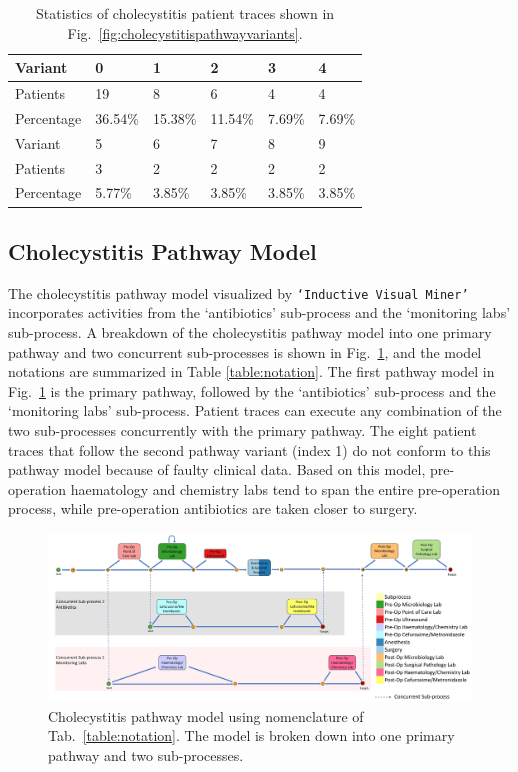 \documentclass{article}
\begin{document}
\begin{table}[t]
\centering
\caption{Statistics of cholecystitis patient traces shown in Fig.~\ref{fig:cholecystitispathwayvariants}.}
\label{table:cholecystitisvarianttable}
\begin{tabular}{llllll}
  \hline
  \hline
Variant &     0  &     1  &     2  &     3  &    4\\
\hline
Patients   &    19 &     8 &     6 &     4 &    4\\
  Percentage &  36.54\% &  15.38\% &  11.54\% &  7.69\% &  7.69\%\\
  \hline
  \hline
Variant &     5  &    6  &    7  &    8 &    9\\
\hline
Patients   &   3 &     2 &     2 &     2 &     2 \\
Percentage &  5.77\% &  3.85\% &  3.85\% &  3.85\% &  3.85\% \\
  \hline
  \hline
\end{tabular}
\end{table}

\subsection{Cholecystitis Pathway Model}
The cholecystitis pathway model visualized by \texttt{`Inductive Visual Miner'} incorporates activities from the `antibiotics' sub-process and the `monitoring labs' sub-process. A breakdown of the cholecystitis pathway model into one primary pathway and two concurrent sub-processes is shown in Fig.~\ref{fig:cholecystitispathwaymodel}, and the model notations are summarized in Table \ref{table:notation}. The first pathway model in Fig.~\ref{fig:cholecystitispathwaymodel} is the primary pathway, followed by the `antibiotics’ sub-process and the `monitoring labs’ sub-process. Patient traces can execute any combination of the two sub-processes concurrently with the primary pathway. The eight patient traces that follow the second pathway variant (index 1) do not conform to this pathway model because of faulty clinical data. Based on this model, pre-operation haematology and chemistry labs tend to span the entire pre-operation process, while pre-operation antibiotics are taken closer to surgery.

\begin{figure}[t]
\centering
\includegraphics[width=18cm,angle=270]{communicative_cholecystitis_process_models_anes.jpg}
\caption{Cholecystitis pathway model using nomenclature of Tab.~\ref{table:notation}. The model is broken down into one primary pathway and two sub-processes.}
\label{fig:cholecystitispathwaymodel}
\end{figure}
\end{document}
